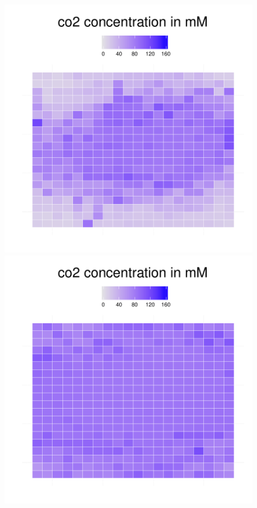 \begin{figure}[h!]
{\begin{minipage}[t]{0.3\textwidth}
  \end{minipage}
  \begin{minipage}[t]{0.3\textwidth}
    \includegraphics[width=\textwidth]{../results/img/beijerinckii_20x20_seed943_co240.pdf}
  \end{minipage}
  \begin{minipage}[t]{0.3\textwidth}
    \includegraphics[width=\textwidth]{../results/img/beijerinckii_20x20_seed943_co250.pdf}

\end{minipage}}
\end{figure}
